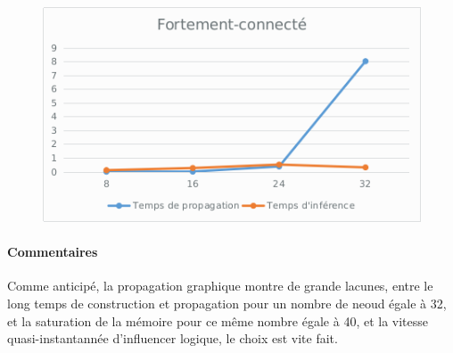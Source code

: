 \documentclass[]{report}
\begin{document}
	\begin{table}[H]
	\centering
	\end{table}

	\begin{figure}[H]
		\centering
		\includegraphics[width=0.75\linewidth]{sheets/strongly.png}
	\end{figure}

	\paragraph{Commentaires}
	Comme anticipé, la propagation graphique montre de grande lacunes, entre le long temps de construction et propagation pour un 
	nombre de neoud égale à 32, et la saturation de la mémoire pour ce même nombre égale à 40, et la vitesse quasi-instantannée 
	d'influencer logique, le choix est vite fait.
\end{document}
